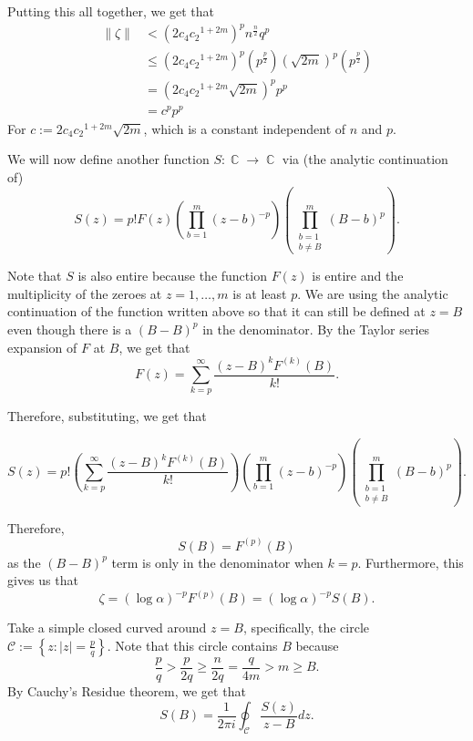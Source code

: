 \documentclass[a4paper, 11pt]{book}
\DeclareMathOperator{\C}{\mathbb{C}}
\begin{document}
Putting this all together, we get that
\begin{align*}
    \| \zeta \| &< {\left(2c_{4}{c_{2}}^{1+2m}\right)}^{p}{n}^{\frac{n}{2}}{q}^{p} \\
                &\leq {\left(2c_{4}{c_{2}}^{1+2m}\right)}^{p}\left({p}^{\frac{p}{2}}\right){\left(\sqrt{2m}\right)}^{p}\left({p}^{\frac{p}{2}}\right) \\
                &= {\left(2c_{4}{c_{2}}^{1+2m}\sqrt{2m}\right)}^{p}{p}^{p} \\
                &= {c}^{p}{p}^{p}
\end{align*}
For $c := 2c_{4}{c_{2}}^{1+2m}\sqrt{2m}$, which is a constant independent of $n$ and $p$.\par

We will now define another function $S : \C \to \C$ via (the analytic continuation of)
\[S(z) = p! F(z) \left(\prod\limits_{b=1}^{m} {(z - b)}^{-p}\right)\left(\prod\limits_{\substack {b = 1 \\ b \neq B}}^{m} {(B - b)}^{p}\right).\]

Note that $S$ is also entire because the function $F(z)$ is entire and the multiplicity of the zeroes at $z = 1, \ldots, m$ is at least $p$. We are using the analytic continuation of the function written above so that it can still be defined at $z = B$ even though there is a ${(B-B)}^{p}$ in the denominator. By the Taylor series expansion of $F$ at $B$, we get that 
\[F(z) = \sum\limits_{k = p}^{\infty} \frac{{(z-B)}^{k}F^{(k)}(B)}{k!}.\]

Therefore, substituting, we get that

\[S(z) = p! \left(\sum\limits_{k = p}^{\infty} \frac{{(z-B)}^{k}F^{(k)}(B)}{k!}\right) \left(\prod\limits_{b=1}^{m} {(z - b)}^{-p}\right)\left(\prod\limits_{\substack {b = 1 \\ b \neq B}}^{m} {(B - b)}^{p}\right).\]

Therefore, \[S(B) = F^{(p)}(B)\] as the ${(B-B)}^{p}$ term is only in the denominator when $k = p$. Furthermore, this gives us that \[\zeta = {(\log \alpha)}^{-p}F^{(p)}(B) = {(\log \alpha)}^{-p}S(B).\]

Take a simple closed curved around $z = B$, specifically, the circle $\mathcal{C} := \left\{z : \vert z \vert = \frac{p}{q}\right\}$. Note that this circle contains $B$ because \[\frac{p}{q} > \frac{p}{2q} \geq \frac{n}{2q} = \frac{q}{4m} > m \geq B.\] By Cauchy's Residue theorem, we get that \[S(B) = \frac{1}{2 \pi i}\oint_{\mathcal{C}} \frac{S(z)}{z-B} dz.\]
\end{document}

